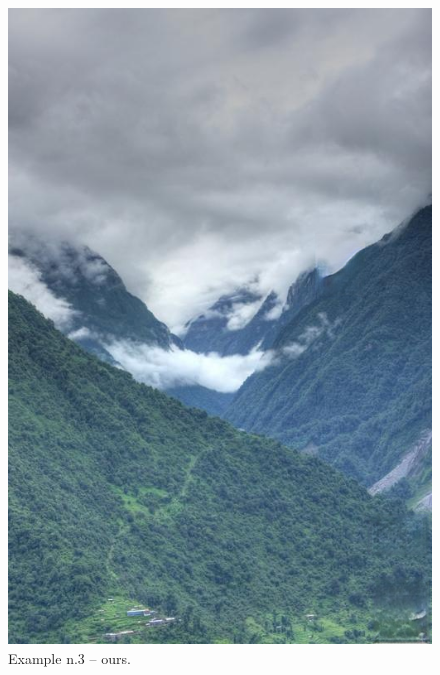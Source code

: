 \documentclass[a4paper, 11pt]{article}
\begin{document}
\begin{figure}
    \centering
    \includegraphics[width=.95\linewidth]{documentation/img/modified/0027.png}
    \caption{Example n.3 -- ours.}
    \label{img:ex_n.3_mask}
\end{figure}
\end{document}
